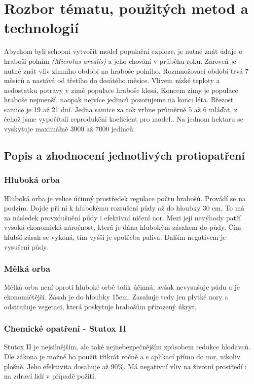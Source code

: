 \documentclass[a4paper,11pt]{article}
\begin{document}
\section{Rozbor tématu, použitých metod a technologií}
Abychom byli schopni vytvořit model populační exploze, je nutné znát údaje o hraboši polním \textit{(Microtus arvalis)} a jeho chování v průběhu roku.
 Zároveň je nutné znát vliv zimního období na hraboše polního. Rozmnožovací období trvá 7 měsíců a nastává od třetího do desátého měsíce.\cite{diplom-Tkadlec} Vlivem nízké teploty a nedostatku potravy v zimě populace hraboše klesá. Koncem zimy je populace hraboše nejmenší, naopak nejvíce jedinců pozorujeme na konci léta.\cite{Winter-temp:online} Březost samice je 19 až 21 dní. Jedna samice za rok vrhne průměrně 5 až 6 mláďat\cite{diplom-Tkadlec}, z čehož jsme vypočítali reprodukční koeficient pro model.\cite{OurCA}. Na jednom hektaru se vyskytuje maximálně 3000 až 7000 jedinců. \cite{hustoty}

\subsection{Popis a zhodnocení jednotlivých protiopatření}
\subsubsection{Hluboká orba}
Hluboká orba je velice účinný prostředek regulace počtu hrabošů. Provádí se na podzim. Dojde při ní k hlubokému rozrušení půdy až do hloubky 30 cm. To má za následek provzdušnění půdy i efektivní ničení nor. Mezi její nevýhody patří vysoká ekonomická náročnost, která je dána hlubokým zásahem do půdy. Čím hlubší zásah se vykoná, tím vyšší je spotřeba paliva. Dalším negativem je vysušení půdy.

\newpage
\subsubsection{Mělká orba}
Mělká orba není oproti hluboké orbě tolik účinná, avšak nevysušuje půdu a je ekonomičtější. Zásah je do hloubky 15cm. Zasahuje tedy jen plytké nory a odstraňuje vegetaci, která poskytuje hrabošům přirozený úkryt.
\subsubsection{Chemické opatření - Stutox II}
Stutox II je nejsilnějším, ale také nejnebezpečnějším způsobem redukce hlodavců. Dle zákona je možné ho použít třikrát ročně a s aplikací přímo do nor, nikoliv plošně. Jeho efektivita dosahuje až 90\%. Má negativní vliv na životní prostředí i na zdraví lidí v případě požití.\cite{stutox}
\end{document}
